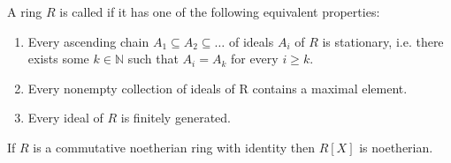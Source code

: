 \begin{definition}
	A ring $R$ is called  if it has one of the following equivalent properties:

	\begin{enumerate}
		\item Every ascending chain $A_1 \subseteq A_2 \subseteq \dots$ of ideals $A_i$ of $R$ is stationary, i.e. there exists some $k \in \mathbb{N}$ such that $A_i = A_k$ for every $i \geq k$.
		\item Every nonempty collection of ideals of R contains a maximal element.
		\item Every ideal of $R$ is finitely generated.
	\end{enumerate}
\end{definition}

\begin{theorem}[Hilbert]
	If $R$ is a commutative noetherian ring with identity then $R[X]$ is noetherian.
\end{theorem}

